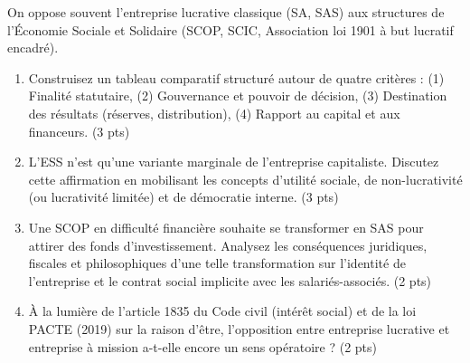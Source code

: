 \documentclass[11pt]{article}
\begin{document}
\begin{exercice}
On oppose souvent l'entreprise lucrative classique (SA, SAS) aux structures de l'Économie Sociale et Solidaire (SCOP, SCIC, Association loi 1901 à but lucratif encadré).
\begin{enumerate}
    \item Construisez un tableau comparatif structuré autour de quatre critères : (1) Finalité statutaire, (2) Gouvernance et pouvoir de décision, (3) Destination des résultats (réserves, distribution), (4) Rapport au capital et aux financeurs. (3 pts)
    \item \og{}L'ESS n'est qu'une variante marginale de l'entreprise capitaliste\fg{}. Discutez cette affirmation en mobilisant les concepts d'utilité sociale, de non-lucrativité (ou lucrativité limitée) et de démocratie interne. (3 pts)
    \item Une SCOP en difficulté financière souhaite se transformer en SAS pour attirer des fonds d'investissement. Analysez les conséquences juridiques, fiscales et philosophiques d'une telle transformation sur l'identité de l'entreprise et le contrat social implicite avec les salariés-associés. (2 pts)
    \item À la lumière de l'article 1835 du Code civil (intérêt social) et de la loi PACTE (2019) sur la \og{}raison d'être\fg{}, l'opposition entre \og{}entreprise lucrative\fg{} et \og{}entreprise à mission\fg{} a-t-elle encore un sens opératoire ? (2 pts)
\end{enumerate}
\end{exercice}
\end{document}
